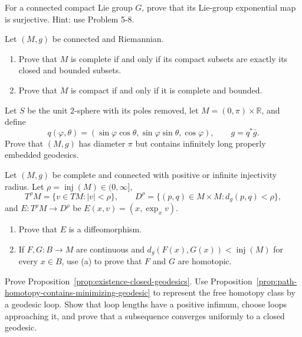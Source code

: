\begin{exercise}
\label{prob:lie-group-exp-surjective}

For a connected compact Lie group $G$, prove that its Lie-group exponential
map is surjective.  Hint: use Problem 5-8.
\end{exercise}

\begin{exercise}
\label{prob:compact-complete-characterization}

Let $(M,g)$ be connected and Riemannian.
\begin{enumerate}
\item[(a)] Prove that $M$ is complete if and only if its compact subsets are
exactly its closed and bounded subsets.
\item[(b)] Prove that $M$ is compact if and only if it is complete and bounded.
\end{enumerate}
\end{exercise}

\begin{exercise}
\label{prob:onion-skin-geodesics}

Let $S$ be the unit $2$-sphere with its poles removed, let
$M=(0,\pi)\times\mathbb R$, and define
\[
q(\varphi,\theta)=(\sin\varphi\cos\theta,\sin\varphi\sin\theta,
\cos\varphi),
\qquad g=q^*\bar g.
\]
Prove that $(M,g)$ has diameter $\pi$ but contains infinitely long properly
embedded geodesics.
\end{exercise}

\begin{exercise}
\label{prob:inj-radius-diffeomorphism}

Let $(M,g)$ be complete and connected with positive or infinite injectivity
radius.  Let $\rho=\operatorname{inj}(M)\in(0,\infty]$,
\[
T^\rho M=\{v\in TM:|v|<\rho\},
\qquad
D^\rho=\{(p,q)\in M\times M:d_g(p,q)<\rho\},
\]
and $E:T^\rho M\to D^\rho$ be
$E(x,v)=(x,\exp_xv)$.
\begin{enumerate}
\item[(a)] Prove that $E$ is a diffeomorphism.
\item[(b)] If $F,G:B\to M$ are continuous and
$d_g(F(x),G(x))<\operatorname{inj}(M)$ for every $x\in B$, use (a) to prove
that $F$ and $G$ are homotopic.
\end{enumerate}
\end{exercise}

\begin{exercise}
\label{prob:closed-geodesic-free-homotopy}

Prove Proposition~\ref{prop:existence-closed-geodesics}.  Use
Proposition~\ref{prop:path-homotopy-contains-minimizing-geodesic} to represent
the free homotopy class by a geodesic loop.  Show that loop lengths have a
positive infimum, choose loops approaching it, and prove that a subsequence
converges uniformly to a closed geodesic.
\end{exercise}

